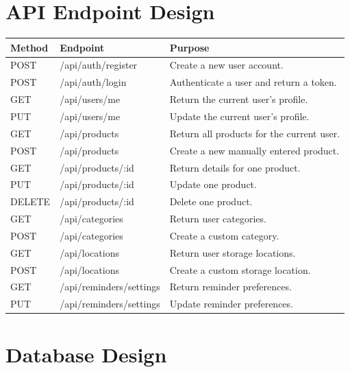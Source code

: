 \documentclass[12pt]{article}
\begin{document}
\section{API Endpoint Design}

\begin{longtable}{|p{}|p{}|p{}|}
\hline
\textbf{Method} & \textbf{Endpoint} & \textbf{Purpose} \\
\hline
POST & /api/auth/register & Create a new user account. \\
\hline
POST & /api/auth/login & Authenticate a user and return a token. \\
\hline
GET & /api/users/me & Return the current user's profile. \\
\hline
PUT & /api/users/me & Update the current user's profile. \\
\hline
GET & /api/products & Return all products for the current user. \\
\hline
POST & /api/products & Create a new manually entered product. \\
\hline
GET & /api/products/:id & Return details for one product. \\
\hline
PUT & /api/products/:id & Update one product. \\
\hline
DELETE & /api/products/:id & Delete one product. \\
\hline
GET & /api/categories & Return user categories. \\
\hline
POST & /api/categories & Create a custom category. \\
\hline
GET & /api/locations & Return user storage locations. \\
\hline
POST & /api/locations & Create a custom storage location. \\
\hline
GET & /api/reminders/settings & Return reminder preferences. \\
\hline
PUT & /api/reminders/settings & Update reminder preferences. \\
\hline
\end{longtable}

\section{Database Design}
\end{document}
